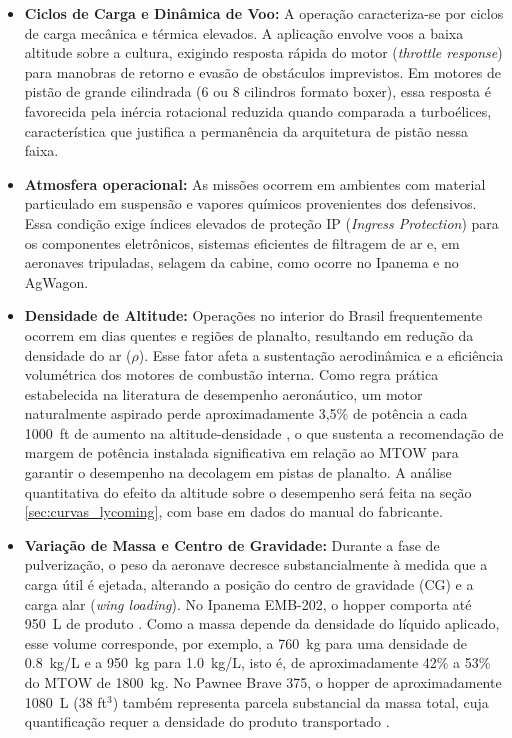 \documentclass[a4paper,12pt]{article}
\begin{document}
\begin{itemize}
    \item \textbf{Ciclos de Carga e Dinâmica de Voo:} A operação caracteriza-se por ciclos de carga mecânica e térmica elevados. A aplicação envolve voos a baixa altitude sobre a cultura, exigindo resposta rápida do motor (\textit{throttle response}) para manobras de retorno e evasão de obstáculos imprevistos. Em motores de pistão de grande cilindrada (6 ou 8 cilindros formato boxer), essa resposta é favorecida pela inércia rotacional reduzida quando comparada a turboélices, característica que justifica a permanência da arquitetura de pistão nessa faixa.
    
    \item \textbf{Atmosfera operacional:} As missões ocorrem em ambientes com material particulado em suspensão e vapores químicos provenientes dos defensivos. Essa condição exige índices elevados de proteção IP (\textit{Ingress Protection}) para os componentes eletrônicos, sistemas eficientes de filtragem de ar e, em aeronaves tripuladas, selagem da cabine, como ocorre no Ipanema e no AgWagon.
    
    \item \textbf{Densidade de Altitude:} Operações no interior do Brasil frequentemente ocorrem em dias quentes e regiões de planalto, resultando em redução da densidade do ar ($\rho$). Esse fator afeta a sustentação aerodinâmica e a eficiência volumétrica dos motores de combustão interna. Como regra prática estabelecida na literatura de desempenho aeronáutico, um motor naturalmente aspirado perde aproximadamente 3{,}5\% de potência a cada \SI{1000}{ft} de aumento na altitude-densidade \cite{cfisteph_density}, o que sustenta a recomendação de margem de potência instalada significativa em relação ao MTOW para garantir o desempenho na decolagem em pistas de planalto. A análise quantitativa do efeito da altitude sobre o desempenho será feita na seção \ref{sec:curvas_lycoming}, com base em dados do manual do fabricante.
    
    \item \textbf{Variação de Massa e Centro de Gravidade:} Durante a fase de pulverização, o peso da aeronave decresce substancialmente à medida que a carga útil é ejetada, alterando a posição do centro de gravidade (CG) e a carga alar (\textit{wing loading}). No Ipanema EMB-202, o hopper comporta até \SI{950}{L} de produto \cite{embraer202_wiki}. Como a massa depende da densidade do líquido aplicado, esse volume corresponde, por exemplo, a \SI{760}{kg} para uma densidade de \SI{0.8}{kg/L} e a \SI{950}{kg} para \SI{1.0}{kg/L}, isto é, de aproximadamente 42\% a 53\% do MTOW de \SI{1800}{kg}. No Pawnee Brave 375, o hopper de aproximadamente \SI{1080}{L} (38 ft$^3$) também representa parcela substancial da massa total, cuja quantificação requer a densidade do produto transportado \cite{piper_pa36}.
\end{itemize}   
\end{document}
